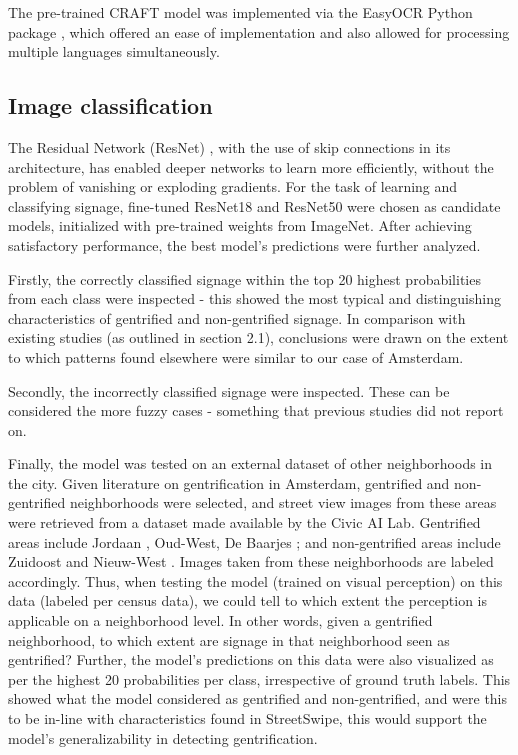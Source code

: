 The pre-trained CRAFT model was implemented via the EasyOCR Python package \cite{noauthor_jaided_nodate}, which offered an ease of implementation and also allowed for processing multiple languages simultaneously.

\subsection{Image classification}
The Residual Network (ResNet) \cite{resnet}, with the use of skip connections in its architecture, has enabled deeper networks to learn more efficiently, without the problem of vanishing or exploding gradients. For the task of learning and classifying signage, fine-tuned ResNet18 and ResNet50 were chosen as candidate models, initialized with pre-trained weights from ImageNet. After achieving satisfactory performance, the best model's predictions were further analyzed. 

Firstly, the correctly classified signage within the top 20 highest probabilities from each class were inspected - this showed the most typical and distinguishing characteristics of gentrified and non-gentrified signage. In comparison with existing studies (as outlined in section 2.1), conclusions were drawn on the extent to which patterns found elsewhere were similar to our case of Amsterdam.

Secondly, the incorrectly classified signage were inspected. These can be considered the more fuzzy cases - something that previous studies did not report on.

Finally, the model was tested on an external dataset of other neighborhoods in the city. Given literature on gentrification in Amsterdam, gentrified and non-gentrified neighborhoods were selected, and street view images from these areas were retrieved from a dataset made available by the Civic AI Lab. Gentrified areas include Jordaan \cite{verlaan_hippies_2022}, Oud-West, De Baarjes \cite{rettberg_when_2019}; and non-gentrified areas include Zuidoost and Nieuw-West \cite{pinkster_stickiness_2020}. Images taken from these neighborhoods are labeled accordingly. Thus, when testing the model (trained on visual perception) on this data (labeled per census data), we could tell to which extent the perception is applicable on a neighborhood level. In other words, given a gentrified neighborhood, to which extent are signage in that neighborhood seen as gentrified? Further, the model's predictions on this data were also visualized as per the highest 20 probabilities per class, irrespective of ground truth labels. This showed what the model considered as gentrified and non-gentrified, and were this to be in-line with characteristics found in StreetSwipe, this would support the model's generalizability in detecting gentrification.

